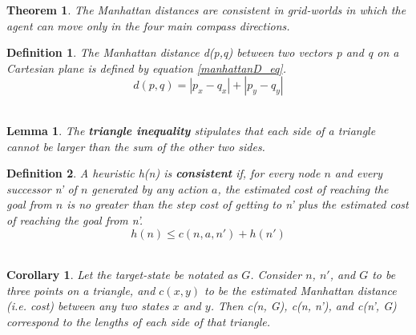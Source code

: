 \documentclass[titlepage]{article}
\newtheorem{theorem}{Theorem}[section]
\newtheorem{definition}{Definition}[section]
\newtheorem{lem}{Lemma}[section]
\newtheorem{corollary}{Corollary}[section]
\begin{document}
    \begin{adjustwidth}{20pt}{20pt}
        
        \begin{theorem}\label{thm2}
            \emph{The Manhattan distances are consistent in grid-worlds in which the agent can move only in the four main compass directions.}\\
        \end{theorem} 
        
        \begin{definition}\label{manhattanD}
            \emph{The Manhattan distance \emph{d(p,q)} between two vectors \emph{p} and \emph{q} on a Cartesian plane is defined by equation \ref{manhattanD_eq}.}\\
            \begin{equation}\label{manhattanD_eq}
                d(p,q) = |p_x - q_x| + |p_y - q_y|
            \end{equation}\\
        \end{definition}
        
         \begin{lem}\label{trienql}
            \emph{The \textbf{triangle inequality} stipulates that each side of a triangle cannot be larger than the sum of the other two sides.\footnotemark}\\
        \end{lem}
        
        \begin{definition}\label{consistency}
            \emph{A heuristic \emph{h(n)} is \textbf{consistent} if, for every node $n$ and every successor \emph{n'} of $n$ generated by any action $a$, the estimated  cost of reaching the goal from $n$ is no greater than the step cost of getting to \emph{n'} plus the estimated cost of reaching the goal from \emph{n'}.\footnotemark}
            \begin{equation}\label{const_eq}
                h(n) \leq c(n, a, n') + h(n')
            \end{equation}\\
        \end{definition}
        
        \begin{corollary}\label{yahmon0}
            \emph{Let the target-state be notated as $G$. Consider $n$, $n'$, and $G$ to be three points on a triangle, and $c(x, y)$ to be the estimated Manhattan distance (i.e. cost) between any two states $x$ and $y$. Then \emph{c(n, G)}, \emph{c(n, n')}, and \emph{c(n', G)} correspond to the lengths of each side of that triangle.\\}
        \end{corollary}
        

\end{adjustwidth}
\end{document}
